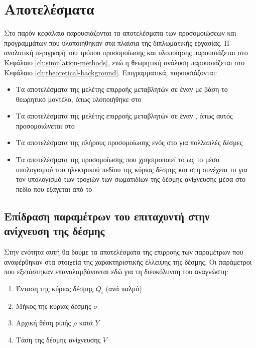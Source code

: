 \chapter{Αποτελέσματα}

Στο παρόν κεφάλαιο παρουσιάζονται τα αποτελέσματα των προσομοιώσεων και προγραμμάτων που υλοποιήθηκαν στα πλαίσια της διπλωματικής εργασίας. 
Η αναλυτική περιγραφή του τρόπου προσομοίωσης και υλοποίησης παρουσιάζεται στο Κεφάλαιο \ref{ch:simulation-methods}, ενώ η θεωρητική ανάλυση παρουσιάζεται στο Κεφάλαιο \ref{ch:theoretical-background}.
Επιγραμματικά, παρουσιάζονται:
\begin{itemize}
\item Τα αποτελέσματα της μελέτης επιρροής μεταβλητών σε έναν  με βάση το θεωρητικό μοντέλο, όπως υλοποιήθηκε στο 
\item Τα αποτελέσματα της μελέτης επιρροής μεταβλητών σε έναν , όπως αυτός προσομοιώνεται στο 
\item Τα αποτελέσματα της πλήρους προσομοίωσης ενός  στο  για πολλαπλές δέσμες
\item Τα αποτελέσματα της προσομοίωσης που χρησιμοποιεί το  ως το μέσο υπολογισμού του ηλεκτρικού πεδίου της κύριας δέσμης και στη συνέχεια το  για τον υπολογισμό των τροχιών των σωματιδίων της δέσμης ανίχνευσης μέσα στο πεδίο που εξάγεται από το 
\end{itemize}

\section{Επίδραση παραμέτρων του επιταχυντή στην ανίχνευση της δέσμης}
Στην ενότητα αυτή θα δούμε τα αποτελέσματα της επιρροής των παραμέτρων που αναφέρθηκαν στα στοιχεία της χαρακτηριστικής έλλειψης της δέσμης.
Οι παράμετροι που εξετάστηκαν επαναλαμβάνονται εδώ για τη διευκόλυνση του αναγνώστη:
\begin{enumerate}
	\item Ένταση της κύριας δέσμης $Q_i$ (ανά παλμό)
	\item Μήκος της κύριας δέσμης $\sigma$
	\item Αρχική θέση ριπής $\rho$ κατά $Y$
	\item Τάση της δέσμης ανίχνευσης $V$
\end{enumerate}

